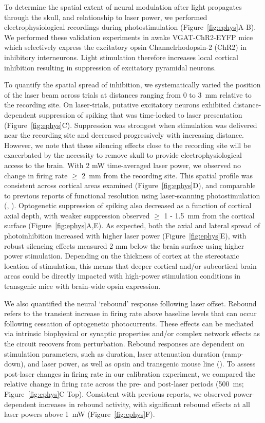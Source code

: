 To determine the spatial extent of neural modulation after light propagates through the skull, and relationship to laser power,  we performed electrophysiological recordings during photostimulation (Figure~\ref{fig:ephys}A-B).
We performed these validation experiments in awake VGAT-ChR2-EYFP mice which selectively express the excitatory opsin Channelrhodopsin-2 (ChR2) in inhibitory interneurons.
Light stimulation therefore increases local cortical inhibition resulting in suppression of excitatory pyramidal neurons.

To quantify the spatial spread of inhibition, we systematically varied the position of the laser beam across trials at distances ranging from 0 to 3~mm relative to the recording site.
On laser-trials, putative excitatory neurons exhibited distance-dependent suppression of spiking that was time-locked to laser presentation (Figure~\ref{fig:ephys}C).
Suppression was strongest when stimulation was delivered near the recording site and decreased progressively with increasing distance.
However, we note that these silencing effects close to the recording site will be exacerbated by the necessity to remove skull to provide electrophysiological access to the brain.
With 2 mW time-averaged laser power, we observed no change in firing rate $\ge$ 2~mm from the recording site.
This spatial profile was consistent across cortical areas examined (Figure~\ref{fig:ephys}D), and comparable to previous reports of functional resolution using laser-scanning photostimulation (\cite{Li2019SpatiotemporalCircuits}, \cite{Pinto2019Task-DependentRegions}).
Optogenetic suppression of spiking also decreased as a function of cortical axial depth, with weaker suppression observed $\ge$ 1 - 1.5~mm from the cortical surface (Figure~\ref{fig:ephys}A,E).
As expected, both the axial and lateral spread of photoinhibition increased with higher laser power (Figure~\ref{fig:ephys}E), with robust silencing effects measured 2 mm below the brain surface using higher power stimulation.
Depending on the thickness of cortex at the stereotaxic location of stimulation, this means that deeper cortical and/or subcortical brain areas could be directly impacted with high-power stimulation conditions in transgenic mice with brain-wide opsin expression.

We also quantified the neural `rebound' response following laser offset.
Rebound refers to the transient increase in firing rate above baseline levels that can occur following cessation of optogenetic photocurrents.
These effects can be mediated via intrinsic biophysical or synaptic properties and/or complex network effects as the circuit recovers from perturbation.
Rebound responses are dependent on stimulation parameters, such as duration, laser attenuation duration (ramp-down), and laser power, as well as opsin and transgenic mouse line (\cite{Li2019SpatiotemporalCircuits}).
To assess post-laser changes in firing rate in our calibration experiment, we compared the relative change in firing rate across the pre- and post-laser periods (500~ms; Figure~\ref{fig:ephys}C Top).
Consistent with previous reports, we observed power-dependent increases in rebound activity, with significant rebound effects at all laser powers above 1~mW (Figure~\ref{fig:ephys}F).

